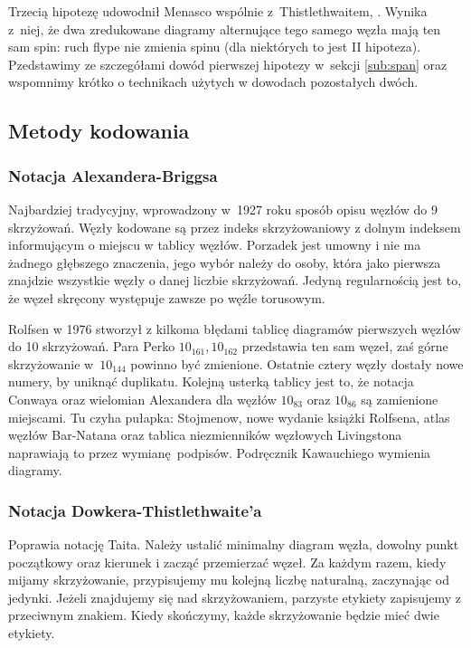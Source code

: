 Trzecią hipotezę udowodnił Menasco wspólnie z~Thistlethwaitem, \cite{menasco91}.
Wynika z~niej, że dwa zredukowane diagramy alternujące tego samego węzła mają ten sam spin: ruch flype nie zmienia spinu (dla niektórych to jest II hipoteza).
Pzedstawimy ze szczegółami dowód pierwszej hipotezy w~sekcji \ref{sub:span} oraz wspomnimy krótko o technikach użytych w dowodach pozostałych dwóch.

\subsection{Metody kodowania}
\subsubsection{Notacja Alexandera-Briggsa}
Najbardziej tradycyjny, wprowadzony w~1927 roku sposób opisu węzłów do 9 skrzyżowań.
Węzły kodowane są przez indeks skrzyżowaniowy z dolnym indeksem informującym o miejscu w tablicy węzłów.
Porzadek jest umowny i nie ma żadnego głębszego znaczenia, jego wybór należy do osoby, która jako pierwsza znajdzie wszystkie węzły o danej liczbie skrzyżowań.
Jedyną regularnością jest to, że węzeł skręcony występuje zawsze po węźle torusowym.

Rolfsen w 1976 stworzył z kilkoma błędami tablicę diagramów pierwszych węzłów do 10 skrzyżowań.
Para Perko $10_{161}, 10_{162}$ przedstawia ten sam węzeł, zaś górne skrzyżowanie w~$10_{144}$ powinno być zmienione.
Ostatnie cztery węzły dostały nowe numery, by uniknąć duplikatu.
Kolejną usterką tablicy jest to, że notacja Conwaya oraz wielomian Alexandera dla węzłów $10_{83}$ oraz $10_{86}$ są zamienione miejscami.
Tu czyha pułapka: Stojmenow, nowe wydanie książki Rolfsena, atlas węzłów Bar-Natana oraz tablica niezmienników węzłowych Livingstona naprawiają to przez wymianę podpisów.
Podręcznik Kawauchiego wymienia diagramy.

\subsubsection{Notacja Dowkera-Thistlethwaite'a}
Poprawia notację Taita.
Należy ustalić minimalny diagram węzła, dowolny punkt początkowy oraz kierunek i zacząć przemierzać węzeł.
Za każdym razem, kiedy mijamy skrzyżowanie, przypisujemy mu kolejną liczbę naturalną, zaczynając od jedynki.
Jeżeli znajdujemy się nad skrzyżowaniem, parzyste etykiety zapisujemy z przeciwnym znakiem.
Kiedy skończymy, każde skrzyżowanie będzie mieć dwie etykiety.

